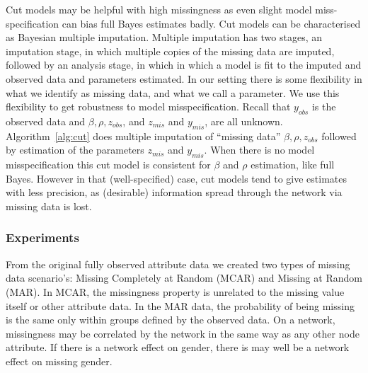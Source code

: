 \documentclass{article}
\begin{document}
Cut models may be helpful with high missingness as even slight model miss-specification can bias full Bayes estimates badly. Cut models can be characterised as Bayesian multiple imputation. Multiple imputation has two stages, an imputation stage, in which multiple copies of the missing data are imputed, followed by an analysis stage, in which in which a model is fit to the imputed and observed data and parameters estimated. In our setting there is some flexibility in what we identify as missing data, and what we call a parameter. We use this flexibility to get robustness to model misspecification. Recall that $y_{obs}$ is the observed data and $\beta,\rho,z_{obs}$, and $z_{mis}$ and $y_{mis}$, are all unknown. Algorithm~\ref{alg:cut} does multiple imputation of ``missing data''
$\beta,\rho,z_{obs}$ followed by estimation of the parameters $z_{mis}$ and $y_{mis}$. When there is no model misspecification this cut model is consistent for $\beta$ and $\rho$ estimation, like full Bayes. However in that (well-specified) case, cut models tend to give estimates with less precision, as (desirable) information spread through the network via missing data is lost.

\subsubsection{Experiments} \label{sec:experiments}

From the original fully observed attribute data we created two types of missing data scenario's: Missing Completely at Random (MCAR) and Missing at Random (MAR). In MCAR,
the missingness property is unrelated to the missing value itself or other attribute data. In the MAR data, the probability of being missing is the same only within groups defined by the observed data. On a network, missingness may be correlated by the network in the same way as any other node attribute.
If there is a network effect on gender, there is may well be a network effect on missing gender.
\end{document}
